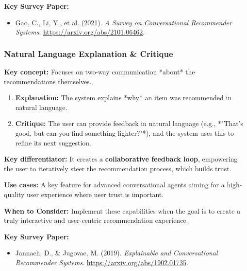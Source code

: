 \documentclass{article}
\begin{document}
\noindent\textbf{Key Survey Paper:}
    \begin{itemize}
        \item Gao, C., Li, Y., et al. (2021). \textit{A Survey on Conversational Recommender Systems}. \url{https://arxiv.org/abs/2101.06462}.
    \end{itemize}

    \subsubsection{Natural Language Explanation \& Critique}
\noindent\textbf{Key concept:} Focuses on two-way communication *about* the recommendations themselves.
    \begin{enumerate}
        \item \textbf{Explanation:} The system explains *why* an item was recommended in natural language.
        \item \textbf{Critique:} The user can provide feedback in natural language (e.g., *"That's good, but can you find something lighter?"*), and the system uses this to refine its next suggestion.
    \end{enumerate}
\noindent\textbf{Key differentiator:} It creates a \textbf{collaborative feedback loop}, empowering the user to iteratively steer the recommendation process, which builds trust.

\noindent\textbf{Use cases:} A key feature for advanced conversational agents aiming for a high-quality user experience where user trust is important.

\noindent\textbf{When to Consider:} Implement these capabilities when the goal is to create a truly interactive and user-centric recommendation experience.

\noindent\textbf{Key Survey Paper:}
    \begin{itemize}
        \item Jannach, D., \& Jugovac, M. (2019). \textit{Explainable and Conversational Recommender Systems}. \url{https://arxiv.org/abs/1902.01735}.
    \end{itemize}
    
\end{document}
